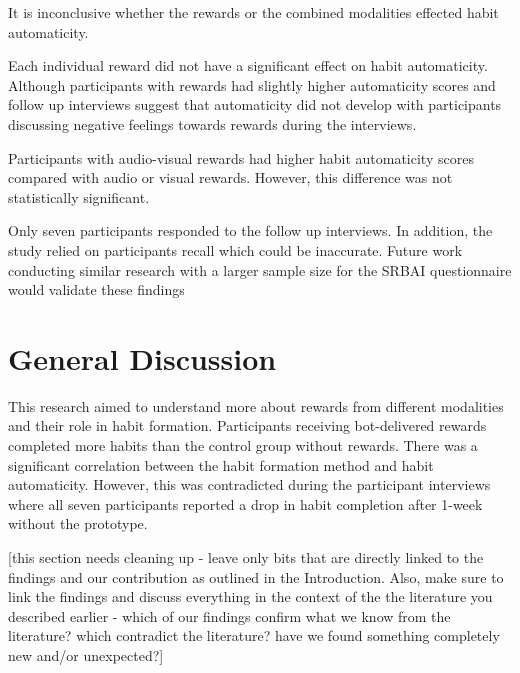 \documentclass{scaffold/sigchi}
\begin{document}
It is inconclusive whether the rewards or the combined modalities effected habit automaticity. 

Each individual reward did not have a significant effect on habit automaticity. Although participants with rewards had slightly higher automaticity scores and follow up interviews suggest that automaticity did not develop with participants discussing negative feelings towards rewards during the interviews.  

Participants with audio-visual rewards had higher habit automaticity scores compared with audio or visual rewards. However, this difference was not statistically significant.

Only seven participants responded to the follow up interviews. In addition, the study relied on participants recall which could be inaccurate. Future work conducting similar research with a larger sample size for the SRBAI questionnaire would validate these findings

\section{General Discussion}
This research aimed to understand more about rewards from different modalities and their role in habit formation. Participants receiving bot-delivered rewards completed more habits than the control group without rewards. There was a significant correlation between the habit formation method and habit automaticity. However, this was contradicted during the participant interviews where all seven participants reported a drop in habit completion after 1-week without the prototype.

[this section needs cleaning up - leave only bits that are directly linked to the findings and our contribution as outlined in the Introduction. Also, make sure to link the findings and discuss everything in the context of the the literature you described earlier - which of our findings confirm what we know from the literature? which contradict the literature? have we found something completely new and/or unexpected?]

\end{document}

